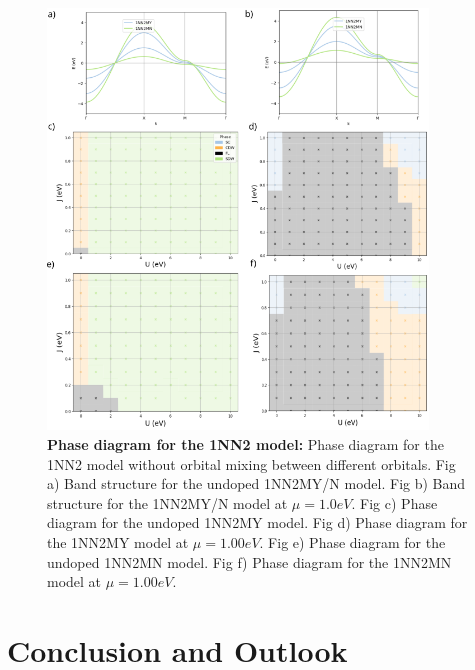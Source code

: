 \documentclass[12pt]{article}
\begin{document}
\begin{figure}[htbp]  %
    \centering
    \includegraphics[width=0.90\textwidth]{1NN2.png}  %
    \caption{\textbf{Phase diagram for the 1NN2 model:} Phase diagram for the 1NN2 model without orbital 
    mixing between different orbitals. Fig a) Band structure for the undoped 1NN2MY/N model. 
    Fig b) Band structure for the 1NN2MY/N model at $\mu =1.0eV$. 
    Fig c) Phase diagram for the undoped 1NN2MY model.
    Fig d) Phase diagram for the 1NN2MY model at $\mu =1.00eV$.
    Fig e) Phase diagram for the undoped 1NN2MN model.
    Fig f) Phase diagram for the 1NN2MN model at $\mu =1.00eV$.}
    \label{fig:1NN2pd}
\end{figure}
\newpage
\section{Conclusion and Outlook}


\newpage


\end{document}
